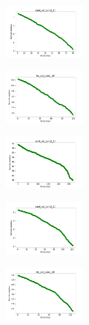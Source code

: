 \begin{figure}[H]
\begin{subfigure}
    \end{subfigure}
    \hfill
    \begin{subfigure}
        \centering
        \includegraphics[width=0.32\textwidth]{img/bl/rand_set_const_10_589741062_cost.png}
    \end{subfigure}
    \hfill
    \begin{subfigure}
        \centering
        \includegraphics[width=0.32\textwidth]{img/bl/iris_set_const_10_277451237_cost.png}
    \end{subfigure}
    \hfill
    \begin{subfigure}
        \centering
        \includegraphics[width=0.32\textwidth]{img/bl/ecoli_set_const_10_277451237_cost.png}
    \end{subfigure}
    \hfill
    \begin{subfigure}
        \centering
        \includegraphics[width=0.32\textwidth]{img/bl/rand_set_const_10_277451237_cost.png}
    \end{subfigure}
    \hfill
    \begin{subfigure}
        \centering
        \includegraphics[width=0.32\textwidth]{img/bl/iris_set_const_10_49258669_cost.png}

\end{subfigure}
\end{figure}
